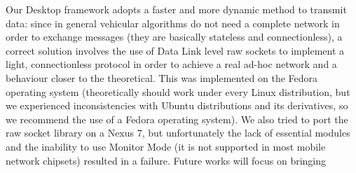 	Our Desktop framework adopts a faster and more dynamic method to transmit data: since in general vehicular algorithms do not need a complete network in order to exchange messages (they are basically stateless and connectionless), a correct solution involves the use of Data Link level raw sockets to implement a light, connectionless protocol in order to achieve a real ad-hoc network and a behaviour closer to the theoretical. This was implemented on the Fedora operating system (theoretically should work under every Linux distribution, but we experienced inconsistencies with Ubuntu distributions and its derivatives, so we recommend the use of a Fedora operating system). We also tried to port the raw socket library on a Nexus 7, but unfortunately the lack of essential modules and the inability to use Monitor Mode (it is not supported in most mobile network chipsets) resulted in a failure. Future works will focus on bringing  

